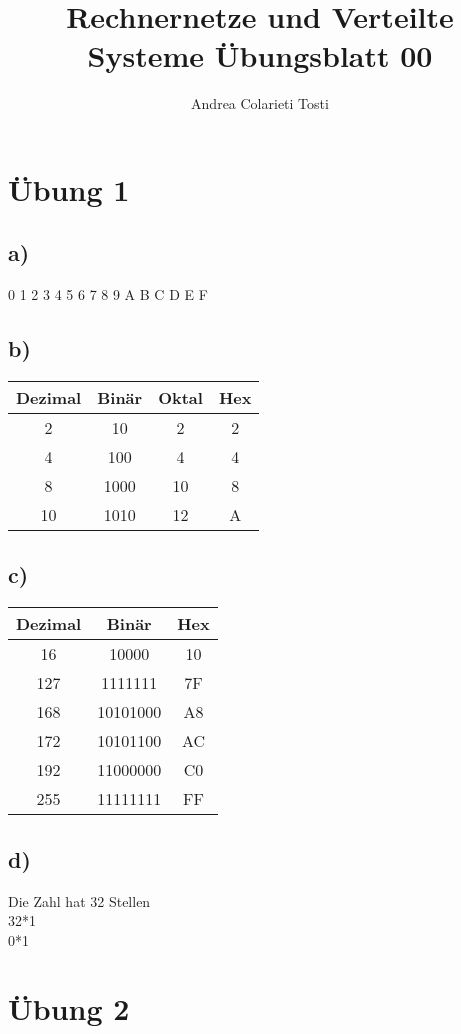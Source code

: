 \documentclass[12pt,a4paper]{article}
\author{Andrea Colarieti Tosti}
\title{Rechnernetze und Verteilte Systeme Übungsblatt 00}
\begin{document}
\maketitle
\section*{Übung 1}
\subsection*{a)}
0 1 2 3 4 5 6 7 8 9 A B C D E F 
\subsection*{b)}
\begin{center}
 \begin{tabular}{|c | c | c | c |} 
 \hline
 Dezimal & Binär & Oktal & Hex \\ [0.5ex] 
 \hline
 2 & 10 & 2 & 2 \\ 
 \hline
 4 & 100 & 4 & 4 \\
 \hline
 8 & 1000 & 10 & 8 \\
 \hline
 10 & 1010 & 12 & A \\
 \hline
\end{tabular}
\end{center}
\subsection*{c)}
\begin{center}
 \begin{tabular}{|c | c | c | } 
 \hline
 Dezimal & Binär & Hex \\ [0.5ex] 
 \hline
 16 & 10000 & 10 \\ 
 \hline
 127 & 1111111 & 7F \\
 \hline
 168 & 10101000 & A8 \\
 \hline
 172 & 10101100 & AC \\
 \hline
 192 & 11000000 & C0 \\
 \hline
 255 &  11111111 & FF \\
 \hline
\end{tabular}
\end{center}\newpage
\subsection*{d)}
Die Zahl hat 32 Stellen \\
32*1\\0*1
\section*{Übung 2}
\end{document}
